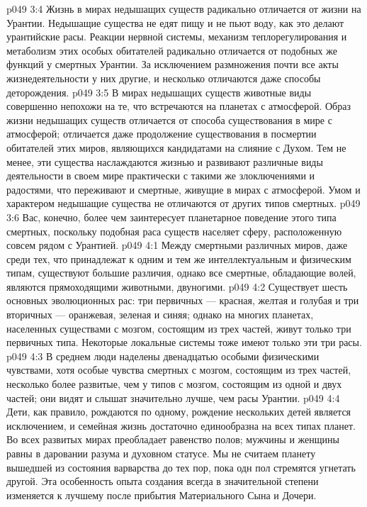 \vs p049 3:4 Жизнь в мирах недышащих существ радикально отличается от жизни на Урантии. Недышащие существа не едят пищу и не пьют воду, как это делают урантийские расы. Реакции нервной системы, механизм теплорегулирования и метаболизм этих особых обитателей радикально отличается от подобных же функций у смертных Урантии. За исключением размножения почти все акты жизнедеятельности у них другие, и несколько отличаются даже способы деторождения.
\vs p049 3:5 В мирах недышащих существ животные виды совершенно непохожи на те, что встречаются на планетах с атмосферой. Образ жизни недышащих существ отличается от способа существования в мире с атмосферой; отличается даже продолжение существования в посмертии обитателей этих миров, являющихся кандидатами на слияние с Духом. Тем не менее, эти существа наслаждаются жизнью и развивают различные виды деятельности в своем мире практически с такими же злоключениями и радостями, что переживают и смертные, живущие в мирах с атмосферой. Умом и характером недышащие существа не отличаются от других типов смертных.
\vs p049 3:6 Вас, конечно, более чем заинтересует планетарное поведение этого типа смертных, поскольку подобная раса существ населяет сферу, расположенную совсем рядом с Урантией.
\vs p049 4:1 Между смертными различных миров, даже среди тех, что принадлежат к одним и тем же интеллектуальным и физическим типам, существуют большие различия, однако все смертные, обладающие волей, являются прямоходящими животными, двуногими.
\vs p049 4:2 Существует шесть основных эволюционных рас: три первичных --- красная, желтая и голубая и три вторичных --- оранжевая, зеленая и синяя; однако на многих планетах, населенных существами с мозгом, состоящим из трех частей, живут только три первичных типа. Некоторые локальные системы тоже имеют только эти три расы.
\vs p049 4:3 В среднем люди наделены двенадцатью особыми физическими чувствами, хотя особые чувства смертных с мозгом, состоящим из трех частей, несколько более развитые, чем у типов с мозгом, состоящим из одной и двух частей; они видят и слышат значительно лучше, чем расы Урантии.
\vs p049 4:4 Дети, как правило, рождаются по одному, рождение нескольких детей является исключением, и семейная жизнь достаточно единообразна на всех типах планет. Во всех развитых мирах преобладает равенство полов; мужчины и женщины равны в даровании разума и духовном статусе. Мы не считаем планету вышедшей из состояния варварства до тех пор, пока одн пол стремятся угнетать другой. Эта особенность опыта создания всегда в значительной степени изменяется к лучшему после прибытия Материального Сына и Дочери.
